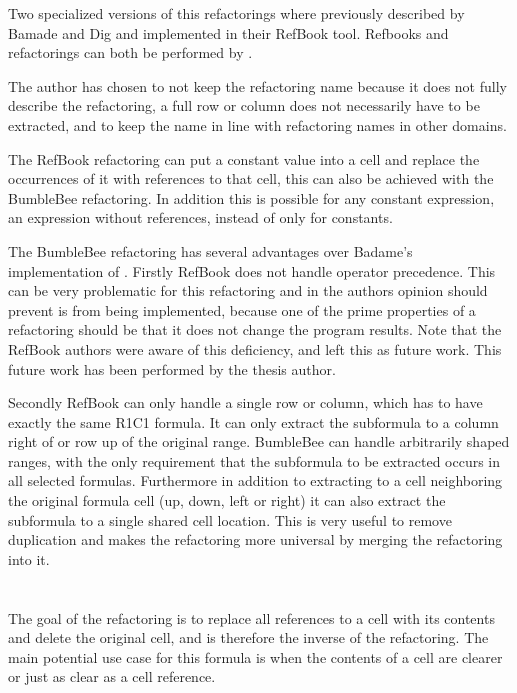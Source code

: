 Two specialized versions of this refactorings where previously described by Bamade and Dig \cite{badame2012refactoring} and implemented in their RefBook tool.
Refbooks  and  refactorings can both be performed by .

The author has chosen to not keep the  refactoring name because it does not fully describe the refactoring, a full row or column does not necessarily have to be extracted, and to keep the name in line with refactoring names in other domains.

The RefBook  refactoring can put a constant value into a cell and replace the occurrences of it with references to that cell, this can also be achieved with the BumbleBee  refactoring.
In addition this is possible for any constant expression, an expression without references, instead of only for constants.

The BumbleBee  refactoring has several advantages over Badame's implementation of .
Firstly RefBook does not handle operator precedence.
This can be very problematic for this refactoring and in the authors opinion should prevent is from being implemented, because one of the prime properties of a refactoring should be that it does not change the program results.
Note that the RefBook authors were aware of this deficiency, and left this as future work.
This future work has been performed by the thesis author.

Secondly RefBook can only handle a single row or column, which has to have exactly the same R1C1 formula. It can only extract the subformula to a column right of or row up of the original range.
BumbleBee can handle arbitrarily shaped ranges, with the only requirement that the subformula to be extracted occurs in all selected formulas.
Furthermore in addition to extracting to a cell neighboring the original formula cell (up, down, left or right) it can also extract the subformula to a single shared cell location.
This is very useful to remove duplication and makes the refactoring more universal by merging the  refactoring into it.

\section{}
\label{refac:inlineformula}

The goal of the  refactoring is to replace all references to a cell with its contents and delete the original cell, and is therefore the inverse of the  refactoring.
The main potential use case for this formula is when the contents of a cell are clearer or just as clear as a cell reference.

